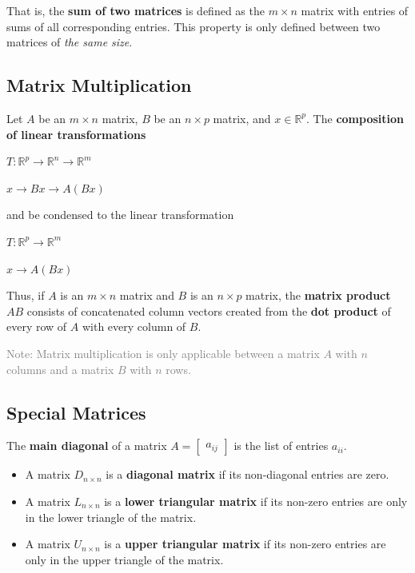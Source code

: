 \documentclass[12pt, letterpaper]{article}
\begin{document}
That is, the \textbf{sum of two matrices} is defined as the $ m
\times n $ matrix with entries of sums of all corresponding entries.
This property is only defined between two matrices of \textit{the same size}.

\subsection*{Matrix Multiplication}

Let $ A $ be an $ m \times n $ matrix, $ B $ be an $ n \times p $
matrix, and $ x \in \mathbb{R}^p $. The \textbf{composition of linear
transformations}

\medskip
{\centering

  $ T: \mathbb{R}^p \rightarrow \mathbb{R}^n \rightarrow \mathbb{R}^m $

  $ x \rightarrow Bx \rightarrow A(Bx) $

}
\medskip

and be condensed to the linear transformation

\medskip
{\centering

  $ T: \mathbb{R}^p \rightarrow \mathbb{R}^m $

  $ x \rightarrow A(Bx) $

}
\medskip

Thus, if $ A $ is an $ m \times n $ matrix and $ B $ is an $ n \times
p $ matrix, the \textbf{matrix product} $ AB $ consists of
concatenated column vectors created from the \textbf{dot product} of
every row of $ A $ with every column of $ B $.
\medskip

\textcolor{gray}{Note: Matrix multiplication is only applicable
between a matrix $ A $ with $ n $ columns and a matrix $ B $ with $ n $ rows.}

\subsection*{Special Matrices}

The \textbf{main diagonal} of a matrix $ A =
\begin{bmatrix} a_{ij}
\end{bmatrix} $ is the list of entries $ a_{ii} $.

\begin{itemize}
  \item A matrix $ D_{n \times n} $ is a \textbf{diagonal matrix} if
    its non-diagonal entries are zero.
  \item A matrix $ L_{n \times n} $ is a \textbf{lower triangular
    matrix} if its non-zero entries are only in the lower triangle of
    the matrix.
  \item A matrix $ U_{n \times n} $ is a \textbf{upper triangular
    matrix} if its non-zero entries are only in the upper triangle of
    the matrix.
\end{itemize}
\end{document}
